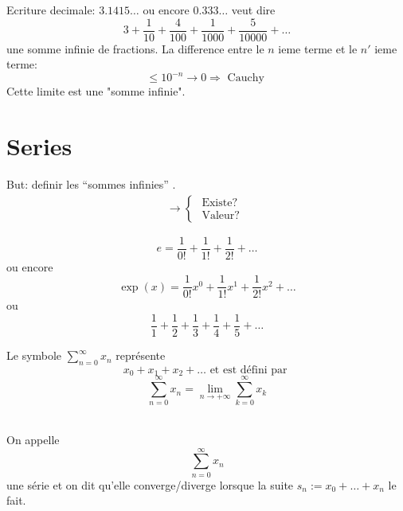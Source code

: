 \documentclass[../main.tex]{subfiles}
\begin{document}
\begin{rmq}
Ecriture decimale:
$3.1415\ldots$ ou encore $0.333\ldots$ veut dire
\[ 
3 + \frac{1}{10} + \frac{4}{100}+ \frac{1}{1000} + \frac{5}{10000} + \ldots
\]
une somme infinie de fractions.
La difference entre le $n$ ieme terme et le $n'$ ieme terme:
\[ 
\leq 10^{-n} \to 0 \Rightarrow  \text{ Cauchy } 
\]
Cette limite est une "somme infinie".
\end{rmq}
\section{Series}
But: definir les ``sommes infinies'' .\\
\begin{align*}
\to 
\begin{cases}
\text{ Existe? } \\
\text{ Valeur? } 
\end{cases}
\end{align*}
\begin{exemple}
\[ 
e = \frac{1}{0!}+ \frac{1}{1!} + \frac{1}{2!} + \ldots
\]
ou encore
\[ 
	\exp(x) = \frac{1}{0!}x^{0}+ \frac{1}{1!}x^{1} + \frac{1}{2!}x^{2} + \ldots
\]
ou
\[ 
\frac{1}{1}+ \frac{1}{2}+ \frac{1}{3}+\frac{1}{4}+\frac{1}{5}+ \ldots
\]
\end{exemple}
\begin{defn}[Serie]\label{defn:serie}
	Le symbole $ \sum_{n=0}^{\infty }x_n$ représente
	\[ 
		x_0 + x_1+x_2 + \ldots \text{ et est défini par } 
	\]
	\[ 
	\sum_{n=0}^{\infty } x_n = \lim_{n \to  + \infty} \sum_{k=0}^{\infty } x_k
	\]
	
\end{defn}
\hr\\
On appelle 
\[ 
\sum_{n=0}^{\infty } x_n
\]
une série et on dit qu'elle converge/diverge lorsque la suite $s_n := x_0 + \ldots + x_n$ le fait.
\end{document}
